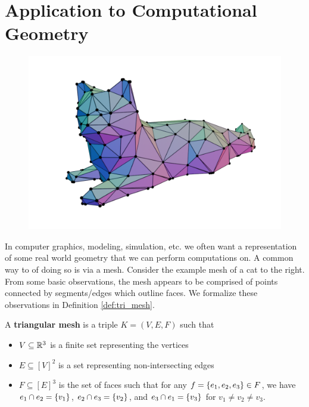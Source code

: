 \documentclass[12pt]{article}
\begin{document}
\section{Application to Computational Geometry}
\begin{figure}
    \centering\vspace{-2cm}
    \includegraphics[width=0.5\pagewidth]{figures/cat.png}
\end{figure}

In computer graphics, modeling, simulation, etc. we often want a representation of some real world geometry that we can perform computations on. A common way to of doing so is via a mesh. Consider the example mesh of a cat to the right. From some basic observations, the mesh appears to be comprised of points connected by segments/edges which outline faces. We formalize these observations in Definition \ref{def:tri_mesh}.

\newpage
\begin{definition}
    \label{def:tri_mesh}
    A \textbf{triangular mesh} is a triple $K = (V, E, F)$ such that
    \begin{itemize}
        \item $V \subseteq \mathbb{R}^3$ is a finite set representing the vertices
        \item $E \subseteq [V]^2$ is a set representing non-intersecting edges
        \item $F \subseteq [E]^3$ is the set of faces such that for any $f = \qty{e_1, e_2, e_3} \in F$, we have $e_1 \cap e_2 = \qty{v_1}$, $e_2 \cap e_3 = \qty{v_2}$, and $e_3 \cap e_1 = \qty{v_3}$ for $v_1 \neq v_2 \neq v_3$. 
    \end{itemize}
\end{definition}
\end{document}
